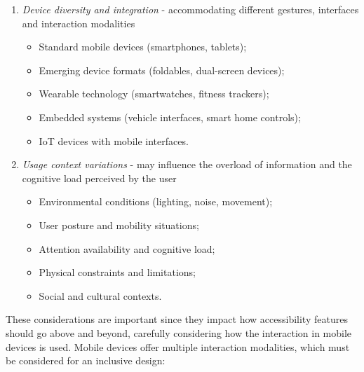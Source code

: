 \begin{enumerate}
    \item \textit{Device diversity and integration} - accommodating different gestures, interfaces and interaction modalities
        \begin{itemize}
            \item Standard mobile devices (smartphones, tablets);
            \item Emerging device formats (foldables, dual-screen devices);
            \item Wearable technology (smartwatches, fitness trackers);
            \item Embedded systems (vehicle interfaces, smart home controls);
            \item IoT devices with mobile interfaces.
        \end{itemize}
    \item \textit{Usage context variations} - may influence the overload of information and the cognitive load perceived by the user
        \begin{itemize}
            \item Environmental conditions (lighting, noise, movement);
            \item User posture and mobility situations;
            \item Attention availability and cognitive load;
            \item Physical constraints and limitations;
            \item Social and cultural contexts.
        \end{itemize}
\end{enumerate}

These considerations are important since they impact how accessibility features should go above and beyond, carefully considering how the interaction in mobile devices is used. Mobile devices offer multiple interaction modalities, which must be considered for an inclusive design:

